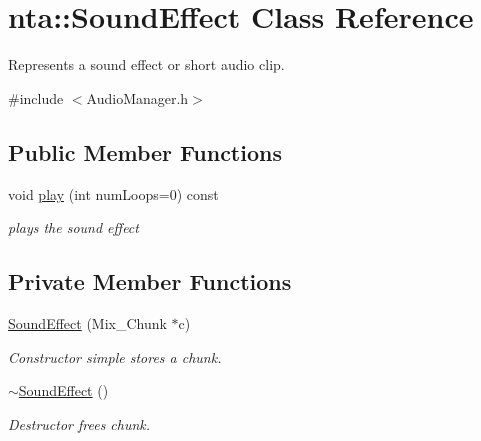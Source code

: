 \hypertarget{classnta_1_1SoundEffect}{}\section{nta\+:\+:Sound\+Effect Class Reference}
\label{classnta_1_1SoundEffect}


Represents a sound effect or short audio clip.  




{\ttfamily \#include $<$Audio\+Manager.\+h$>$}

\subsection*{Public Member Functions}
\begin{DoxyCompactItemize}
\item 
\mbox{\label{classnta_1_1SoundEffect_a2955a9f115c4e3690a9ef82eb05d498c}} 
void \hyperlink{classnta_1_1SoundEffect_a2955a9f115c4e3690a9ef82eb05d498c}{play} (int num\+Loops=0) const
\begin{DoxyCompactList}\small\item\em plays the sound effect \end{DoxyCompactList}\end{DoxyCompactItemize}
\subsection*{Private Member Functions}
\begin{DoxyCompactItemize}
\item 
\mbox{\label{classnta_1_1SoundEffect_a90adfaad718cb8d4fcec601bb87c0227}} 
\hyperlink{classnta_1_1SoundEffect_a90adfaad718cb8d4fcec601bb87c0227}{Sound\+Effect} (Mix\+\_\+\+Chunk $\ast$c)
\begin{DoxyCompactList}\small\item\em Constructor simple stores a chunk. \end{DoxyCompactList}\item 
\mbox{\label{classnta_1_1SoundEffect_ab9cfa134a49f54f77c2dbc05d7674630}} 
\hyperlink{classnta_1_1SoundEffect_ab9cfa134a49f54f77c2dbc05d7674630}{$\sim$\+Sound\+Effect} ()
\begin{DoxyCompactList}\small\item\em Destructor frees chunk. \end{DoxyCompactList}\end{DoxyCompactItemize}

